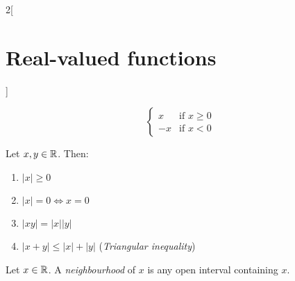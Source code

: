 \documentclass[../../../main.tex]{subfiles}
\begin{document}
\begin{multicols}{2}[\section{Real-valued functions}]
\begin{definition}
\begin{equation*}
\begin{cases}
        x  & \text{if }x\geq 0 \\
        -x & \text{if }x<0
      \end{cases}
    \end{equation*}
  \end{definition}
  \begin{lemma}
    Let $x,y\in\mathbb{R}$. Then:
    \begin{enumerate}
      \item $|x|\geq 0$
      \item $|x|=0\iff x=0$
      \item $|xy|=|x||y|$
      \item $|x+y|\leq|x|+|y|$ (\emph{Triangular inequality})
    \end{enumerate}
  \end{lemma}
  \begin{definition}
    Let $x\in\mathbb{R}$. A \emph{neighbourhood} of $x$ is any open interval containing $x$.
  \end{definition}

\end{multicols}
\end{document}
